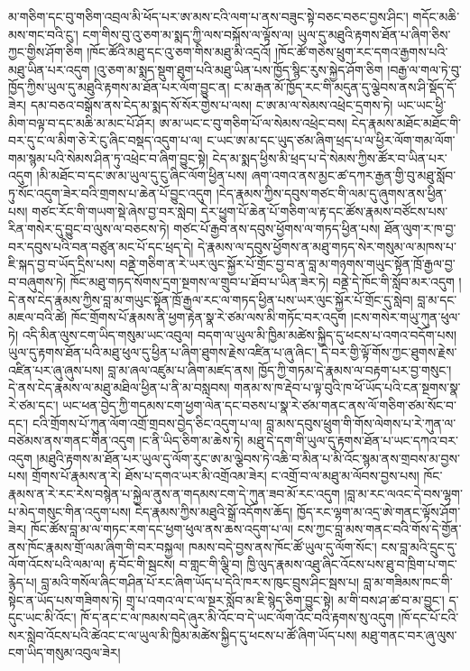 \documentclass{article}
\begin{document}
མ་གཅིག་དང་བུ་གཅིག་འབྲལ་མི་ཕོད་པར་ཨ་མས་ངའི་ལག་པ་ནས་བཟུང་སྟེ་བཅང་བཅང་བྱས་ཤིང་། གདོང་མཆི་མས་གང་བའི་ངུ་། ངག་གིས་བུ་འུ་ཅག་མ་སྨད་ཀྱི་ལས་བསྐོས་ལ་ལྟོས་ལ། ཡུལ་དུ་མཐུའི་རྟགས་ཐོན་པ་ཞིག་ཅིས་ཀྱང་གྱིས་ཤོག་ཅིག །ཁོང་ཚོའི་མཐུ་དང་འུ་ཅག་གིས་མཐུ་མི་འདྲའོ། །ཁོང་ཚོ་གཅེས་ཕྲུག་རང་དགའ་རྒྱགས་པའི་མཐུ་ཡིན་པར་འདུག །འུ་ཅག་མ་སྨད་སྡུག་ཐུག་པའི་མཐུ་ཡིན་པས་ཁྱོད་སྙིང་རུས་སྐྱེད་ཤོག་ཅིག །བརྒྱ་ལ་གལ་ཏེ་བུ་ཁྱོད་ཀྱིས་ཡུལ་དུ་མཐུའི་རྟགས་མ་ཐོན་པར་ལོག་བྱུང་ན། ང་མ་རྒན་མོ་ཁྱོད་རང་གི་མདུན་དུ་ལྕེབས་ནས་ཤི་སྡོད་དོ་ཟེར། དམ་བཅའ་བསྒོས་ནས་ངེད་མ་སྨད་སོ་སོར་གྱེས་པ་ལས། ང་ཨ་མ་ལ་སེམས་འཕྲེང་དྲགས་ཏེ། ཡང་ཡང་ཕྱི་མིག་བལྟ་བ་དང་མཆི་མ་མང་པོ་ཤོར། ཨ་མ་ཡང་ང་བུ་གཅིག་པོ་ལ་སེམས་འཕྲེང་བས། ངེད་རྣམས་མཐོང་མཐོང་གི་བར་དུ་ང་ལ་མིག་ཅེ་རེ་ངུ་ཞིང་བསྡད་འདུག་པ་ལ། ང་ཡང་ཨ་མ་དང་ཡུད་ཙམ་ཞིག་ཕྲད་པ་ལ་ཕྱིར་ལོག་གམ་ལོག་གམ་སྙམ་པའི་སེམས་ཤིན་ཏུ་འཕྲེང་བ་ཞིག་བྱུང་སྟེ། ངེད་མ་སྨད་ཕྱིས་མི་ཕྲད་པ་དེ་སེམས་ཀྱིས་ཚོར་བ་ཡིན་པར་འདུག །མི་མཐོང་བ་དང་ཨ་མ་ཡུལ་དུ་ངུ་ཞིང་ལོག་ཕྱིན་པས། ཞག་འགའ་ནས་མྱང་ཚ་དཀར་རྒྱན་གྱི་བུ་མཐུ་སློབ་ཏུ་སོང་འདུག་ཟེར་བའི་གྲགས་པ་ཆེན་པོ་བྱུང་འདུག །ངེད་རྣམས་ཀྱིས་དབུས་གཙང་གི་ལམ་དུ་ཞུགས་ནས་ཕྱིན་པས། གཙང་རོང་གི་གཡག་སྡེ་ཞེས་བྱ་བར་སླེབ། དེར་ཕྱུག་པོ་ཆེན་པོ་གཅིག་ལ་རྟ་དང་ཚོས་རྣམས་བཙོངས་པས་རིན་གསེར་དུ་བྱུང་བ་ལུས་ལ་བཅངས་ཏེ། གཙང་པོ་རྒྱབ་ནས་དབུས་ཕྱོགས་ལ་གཏད་ཕྱིན་པས། ཐོན་ལུག་ར་ཁ་བྱ་བར་དབུས་པའི་བན་བཙུན་མང་པོ་དང་ཕྲད་དེ། དེ་རྣམས་ལ་དབུས་ཕྱོགས་ན་མཐུ་གཏད་སེར་གསུམ་ལ་མཁས་པ་ཇི་སྐད་བྱ་བ་ཡོད་དྲིས་པས། བནྡེ་གཅིག་ན་རེ་ཡར་ལུང་སྐྱོར་པོ་གྲོང་བྱ་བ་ན་བླ་མ་གཉགས་གཡུང་སྟོན་ཁྲོ་རྒྱལ་བྱ་བ་བཞུགས་ཏེ། ཁོང་མཐུ་གཏད་སོགས་དྲག་སྔགས་ལ་གྲུབ་པ་ཐོབ་པ་ཡིན་ཟེར་ཏེ། བནྡེ་དེ་ཁོང་གི་སློབ་མར་འདུག །དེ་ནས་ངེད་རྣམས་ཀྱིས་བླ་མ་གཡུང་སྟོན་ཁྲོ་རྒྱལ་རང་ལ་གཏད་ཕྱིན་པས་ཡར་ལུང་སྐྱོར་པོ་གྲོང་དུ་སླེབ། བླ་མ་དང་མཇལ་བའི་ཚེ། ཁོང་གྲོགས་པོ་རྣམས་ནི་ཕྱག་རྟེན་སྣ་རེ་ཙམ་ལས་མི་གཏོང་བར་འདུག །ངས་གསེར་གཡུ་ཀུན་ཕུལ་ཏེ། འདི་མིན་ལུས་ངག་ཡིད་གསུམ་ཡང་འབུལ། བདག་ལ་ཡུལ་མི་ཁྱིམ་མཚེས་སྐྱིད་དུ་ཕངས་པ་འགའ་བདོག་པས། ཡུལ་དུ་རྟགས་ཐོན་པའི་མཐུ་ཕུལ་དུ་ཕྱིན་པ་ཞིག་ཐུགས་རྗེས་འཛིན་པ་ཞུ་ཞིང་། དེ་བར་གྱི་ལྟོ་གོས་ཀྱང་ཐུགས་རྗེས་འཛིན་པར་ཞུ་ཞུས་པས། བླ་མ་ཞལ་འཛུམ་པ་ཞིག་མཛད་ནས། ཁྱོད་ཀྱི་གཏམ་དེ་རྣམས་ལ་བརྟག་པར་བྱ་གསུང་། དེ་ནས་ངེད་རྣམས་ལ་མཐུ་མཐིལ་ཕྱིན་པ་ནི་མ་བསླབས། གནམ་ས་ཁ་རྡེབ་པ་ལྟ་བུའི་ཁ་ཕོ་ཡོད་པའི་ངན་སྔགས་སྣ་རེ་ཙམ་དང་། ཡང་ཕན་བྱེད་ཀྱི་གདམས་ངག་ཕྱག་ལེན་དང་བཅས་པ་སྣ་རེ་ཙམ་གནང་ནས་ལོ་གཅིག་ཙམ་སོང་བ་དང་། ངའི་གྲོགས་པོ་ཀུན་ལོག་འགྲོ་གྲབས་བྱེད་ཅིང་འདུག་པ་ལ། བླ་མས་དབུས་ཕྲུག་གི་གོས་ལེགས་པ་རེ་ཀུན་ལ་བཙེམས་ནས་གནང་གིན་འདུག །ང་ནི་ཡིད་ཅིག་མ་ཆེས་ཏེ། མཐུ་དེ་དག་གི་ཡུལ་དུ་རྟགས་ཐོན་པ་ཡང་དཀའ་བར་འདུག །མཐུའི་རྟགས་མ་ཐོན་པར་ཡུལ་དུ་ལོག་རུང་ཨ་མ་ལྕེབས་ཏེ་འཆི་བ་མིན་པ་མི་འོང་སྙམ་ནས་གྲབས་མ་བྱས་པས། གྲོགས་པོ་རྣམས་ན་རེ། ཐོས་པ་དགའ་ཡར་མི་འགྲོའམ་ཟེར། ང་འགྲོ་བ་ལ་མཐུ་མ་ལོབས་བྱས་པས། ཁོང་རྣམས་ན་རེ་རང་རེས་བསྙེན་པ་སྐྱེལ་ནུས་ན་གདམས་ངག་དེ་ཀུན་ཟབ་མོ་རང་འདུག །བླ་མ་རང་ལའང་དེ་བས་ལྷག་པ་མེད་གསུང་གིན་འདུག་པས། ངེད་རྣམས་ཀྱིས་མཐུའི་སྒྲོ་འདོགས་ཆོད། ཁྱོད་རང་ལྷག་མ་འདྲ་ཨེ་གནང་ལྟོས་ཤོག་ཟེར། ཁོང་ཚོས་བླ་མ་ལ་གཏང་རག་དང་ཕྱག་ཕུལ་ནས་ཆས་འདུག་པ་ལ། ངས་ཀྱང་བླ་མས་གནང་བའི་གོས་དེ་གྱོན་ནས་ཁོང་རྣམས་གྲོ་ལམ་ཞིག་གི་བར་བསྐྱལ། ཁམས་བདེ་བྱས་ནས་ཁོང་ཚོ་ཡུལ་དུ་ལོག་སོང་། ངས་བླ་མའི་དྲུང་དུ་ལོག་འོངས་པའི་ལམ་ལ། རྟ་བོང་གི་སྦངས། བ་གླང་གི་ལྕི་བ། ཁྱི་ལུད་རྣམས་འཐུ་ཞིང་འོངས་པས་ཐུ་བ་ཁྲིག་པ་གང་རྙེད་པ། བླ་མའི་གསོལ་ཞིང་གཤིན་པོ་རང་ཞིག་ཡོད་པ་དེའི་ཁར་ས་ཁུང་བྲུས་ཤིང་སྦས་པ། བླ་མ་གཟིམས་ཁང་གི་སྟེང་ན་ཡོད་པས་གཟིགས་ཏེ། གྲྭ་པ་འགའ་ལ་ང་ལ་སྔར་སློབ་མ་ཇི་སྙེད་ཅིག་བྱུང་སྟེ། མ་གི་བས་ཤ་ཚ་བ་མ་བྱུང་། ད་དུང་ཡང་མི་འོང་། ཁོ་ད་ནང་ང་ལ་ཁམས་བདེ་ཞུར་མི་འོང་བ་དེ་ཡང་ལོག་འོང་བའི་རྟགས་སུ་འདུག །ཁོ་དང་པོ་ངའི་སར་སླེབ་འོངས་པའི་ཚེའང་ང་ལ་ཡུལ་མི་ཁྱིམ་མཚེས་སྐྱིད་དུ་ཕངས་པ་ཚོ་ཞིག་ཡོད་པས། མཐུ་གནང་བར་ཞུ་ལུས་ངག་ཡིད་གསུམ་འབུལ་ཟེར། 
\end{document}
